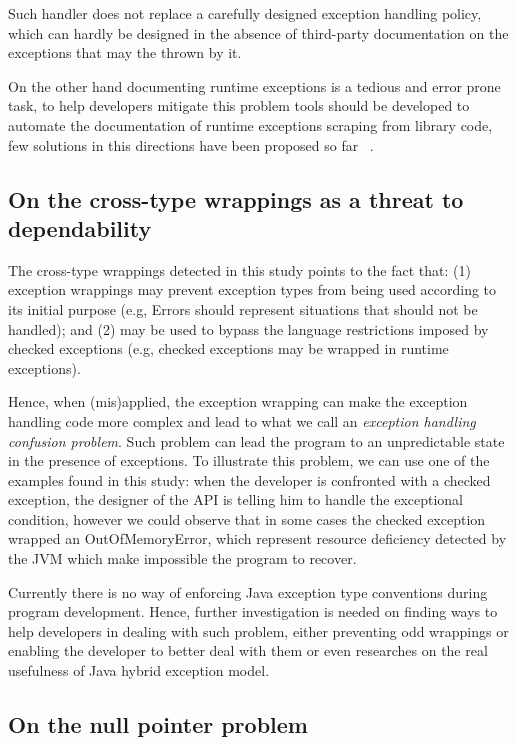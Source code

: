 \documentclass[conference]{IEEEtran}
\begin{document}
Such handler does not replace a carefully designed exception 
handling policy, which can hardly be designed in the absence of 
third-party documentation on the exceptions that
may the thrown by it.

On the other hand documenting runtime exceptions is a tedious and error prone task, to help developers
mitigate this problem tools should be developed to automate the documentation of runtime exceptions
scraping from library code, few solutions in this directions have been proposed so far ~\cite{van2005combining}. 

\subsection{On the cross-type wrappings as a threat to dependability}
The cross-type wrappings detected in this study points to the fact that: (1) exception 
wrappings may prevent exception types from being used according to its initial purpose
 (e.g, Errors should represent situations that should not be handled); and (2) may  be used
 to bypass the language restrictions imposed by checked exceptions  (e.g,
 checked exceptions may be wrapped in runtime exceptions).

Hence, when (mis)applied, the exception wrapping can make the exception handling code
 more complex and lead to what we call an \emph{exception handling confusion problem}.
Such problem can lead the program to
an unpredictable state in the presence of exceptions. To illustrate this problem, we can use
 one of the examples found in this study: when the developer is 
confronted with a checked exception, the designer of the API is telling him 
to handle the exceptional condition, however we could observe that in some cases the 
checked exception wrapped an OutOfMemoryError, which represent resource deficiency detected 
by the JVM which make impossible the program to recover. 

Currently there is no way of enforcing Java exception type conventions during program development.
Hence, further investigation is needed on finding ways to help developers in dealing with such
 problem, either preventing odd wrappings or enabling the developer to better deal with them or even
researches on the real usefulness of Java hybrid exception model. 


\subsection{On the null pointer problem}
\end{document}
